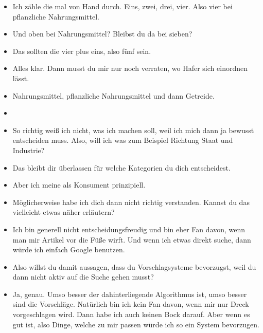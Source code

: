{\begin{itemize}[]
                  Und oben wären das sieben.
                  Obwohl, warte mal.
                  Dann wäre der Rindfleischburger doppelt gezählt.
                  Und ich glaube, dass das mit den fünf auch nicht ganz passt.
            \item {} Ich zähle die mal von Hand durch. Eins, zwei, drei, vier. Also vier bei pflanzliche Nahrungsmittel.
            \item {} Und oben bei Nahrungsmittel? Bleibst du da bei sieben?
            \item {} Das sollten die vier plus eins, also fünf sein.
            \item {} Alles klar. Dann musst du mir nur noch verraten, wo Hafer sich einordnen lässt.
            \item {} Nahrungsmittel, pflanzliche Nahrungsmittel und dann Getreide.
            \item {}
            \item {} So richtig weiß ich nicht, was ich machen soll, weil ich mich dann ja bewusst entscheiden muss.
                  Also, will ich was zum Beispiel Richtung Staat und Industrie?
            \item {} Das bleibt dir überlassen für welche Kategorien du dich entscheidest.
            \item {} Aber ich meine als Konsument prinzipiell.
            \item {} Möglicherweise habe ich dich dann nicht richtig verstanden. Kannst du das vielleicht etwas näher erläutern?
            \item {} Ich bin generell nicht entscheidungsfreudig und bin eher Fan davon, wenn man mir Artikel vor die Füße wirft.
                  Und wenn ich etwas direkt suche, dann würde ich einfach Google benutzen.
            \item {} Also willst du damit aussagen, dass du Vorschlagsysteme bevorzugst, weil du dann nicht aktiv auf die Suche gehen musst?
            \item {} Ja, genau.
                  Umso besser der dahinterliegende Algorithmus ist, umso besser sind die Vorschläge.
                  Natürlich bin ich kein Fan davon, wenn mir nur Dreck vorgeschlagen wird.
                  Dann habe ich auch keinen Bock darauf.
                  Aber wenn es gut ist, also Dinge, welche zu mir passen würde ich so ein System bevorzugen.

\end{itemize}}
